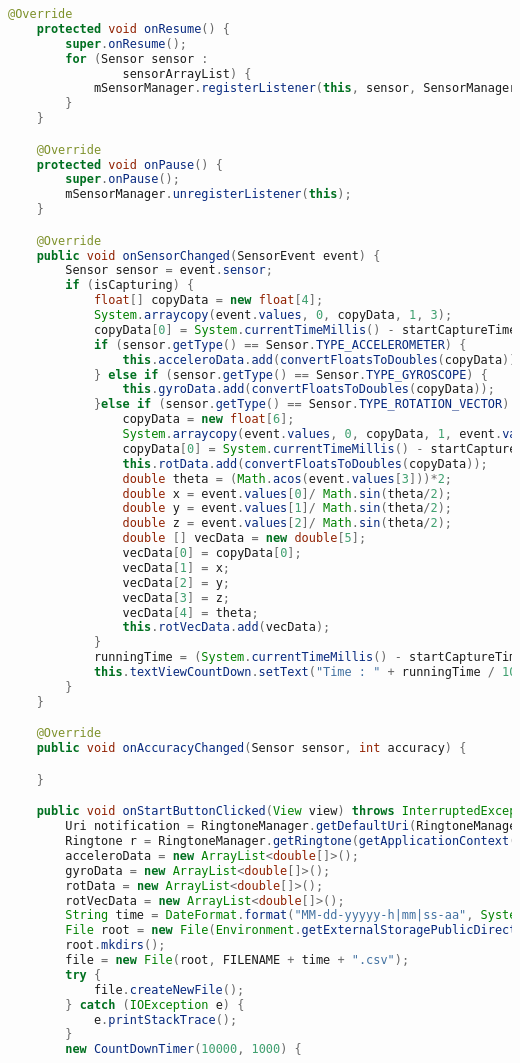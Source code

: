 \begin{lstlisting}[language=Java,basicstyle=\tiny,caption=RecordAllRAWSensorData.java]
    @Override
    protected void onResume() {
        super.onResume();
        for (Sensor sensor :
                sensorArrayList) {
            mSensorManager.registerListener(this, sensor, SensorManager.SENSOR_DELAY_GAME);
        }
    }

    @Override
    protected void onPause() {
        super.onPause();
        mSensorManager.unregisterListener(this);
    }

    @Override
    public void onSensorChanged(SensorEvent event) {
        Sensor sensor = event.sensor;
        if (isCapturing) {
            float[] copyData = new float[4];
            System.arraycopy(event.values, 0, copyData, 1, 3);
            copyData[0] = System.currentTimeMillis() - startCaptureTime;
            if (sensor.getType() == Sensor.TYPE_ACCELEROMETER) {
                this.acceleroData.add(convertFloatsToDoubles(copyData));
            } else if (sensor.getType() == Sensor.TYPE_GYROSCOPE) {
                this.gyroData.add(convertFloatsToDoubles(copyData));
            }else if (sensor.getType() == Sensor.TYPE_ROTATION_VECTOR) {
                copyData = new float[6];
                System.arraycopy(event.values, 0, copyData, 1, event.values.length);
                copyData[0] = System.currentTimeMillis() - startCaptureTime;
                this.rotData.add(convertFloatsToDoubles(copyData));
                double theta = (Math.acos(event.values[3]))*2;
                double x = event.values[0]/ Math.sin(theta/2);
                double y = event.values[1]/ Math.sin(theta/2);
                double z = event.values[2]/ Math.sin(theta/2);
                double [] vecData = new double[5];
                vecData[0] = copyData[0];
                vecData[1] = x;
                vecData[2] = y;
                vecData[3] = z;
                vecData[4] = theta;
                this.rotVecData.add(vecData);
            }
            runningTime = (System.currentTimeMillis() - startCaptureTime);
            this.textViewCountDown.setText("Time : " + runningTime / 1000 + "sec");
        }
    }

    @Override
    public void onAccuracyChanged(Sensor sensor, int accuracy) {

    }

    public void onStartButtonClicked(View view) throws InterruptedException {
        Uri notification = RingtoneManager.getDefaultUri(RingtoneManager.TYPE_NOTIFICATION);
        Ringtone r = RingtoneManager.getRingtone(getApplicationContext(), notification);
        acceleroData = new ArrayList<double[]>();
        gyroData = new ArrayList<double[]>();
        rotData = new ArrayList<double[]>();
        rotVecData = new ArrayList<double[]>();
        String time = DateFormat.format("MM-dd-yyyyy-h|mm|ss-aa", System.currentTimeMillis()).toString();
        File root = new File(Environment.getExternalStoragePublicDirectory(Environment.DIRECTORY_DOCUMENTS) + File.separator + "DataSensors");
        root.mkdirs();
        file = new File(root, FILENAME + time + ".csv");
        try {
            file.createNewFile();
        } catch (IOException e) {
            e.printStackTrace();
        }
        new CountDownTimer(10000, 1000) {


\end{lstlisting}
